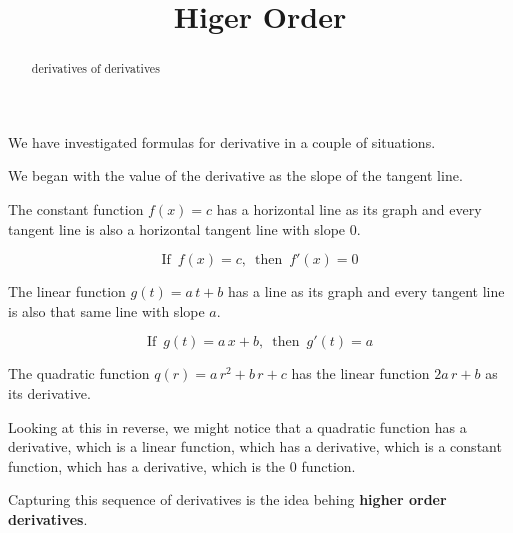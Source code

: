 \documentclass{ximera}
\title{Higer Order}
\begin{document}
\begin{abstract}
  derivatives of derivatives
\end{abstract}
\maketitle





We have investigated formulas for derivative in a couple of situations.


We began with the value of the derivative as the slope of the tangent line.

The constant function $f(x) = c$ has a horizontal line as its graph and every tangent line is also a horizontal tangent line with slope $0$.


\[
\text{If } \, f(x) = c, \, \text{ then } \, f'(x) = 0
\]



The linear function $g(t) = a \, t + b$ has a line as its graph and every tangent line is also that same line with slope $a$.



\[
\text{If } \, g(t) = a \, x + b, \, \text{ then } \, g'(t) = a
\]




The quadratic function $q(r) = a \, r^2 + b \, r + c$ has the linear function $2a \, r + b$ as its derivative.





Looking at this in reverse, we might notice that a quadratic function has a derivative, which is a linear function, which has a derivative, which is a constant function, which has a derivative, which is the $0$ function.



Capturing this sequence of derivatives is the idea behing \textbf{higher order derivatives}.
\end{document}
